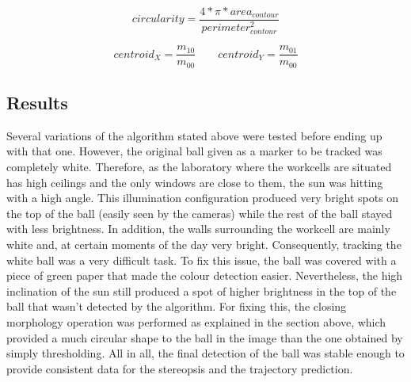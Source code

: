 \begin{equation}
circularity=\frac{4*\pi*area_{contour}}{perimeter_{contour}^{2}}
\label{eq:circularity}
\end{equation}

\begin{equation}
centroid_{X}=\frac{m_{10}}{m_{00}} \qquad centroid_{Y}=\frac{m_{01}}{m_{00}}
\label{eq:centroids}
\end{equation}

\subsection{Results}
Several variations of the algorithm stated above were tested before ending up with that one. However, the original ball given as a marker to be tracked was completely white. Therefore, as the laboratory where the workcells are situated has high ceilings and the only windows are close to them, the sun was hitting with a high angle. This illumination configuration produced very bright spots on the top of the ball (easily seen by the cameras) while the rest of the ball stayed with less brightness. In addition, the walls surrounding the workcell are mainly white and, at certain moments of the day very bright. Consequently, tracking the white ball was a very difficult task. To fix this issue, the ball was covered with a piece of green paper that made the colour detection easier. Nevertheless, the high inclination of the sun still produced a spot of higher brightness in the top of the ball that wasn't detected by the algorithm. For fixing this, the closing morphology operation was performed as explained in the section above, which provided a much circular shape to the ball in the image than the one obtained by simply thresholding.
All in all, the final detection of the ball was stable enough to provide consistent data for the stereopsis and the trajectory prediction.

